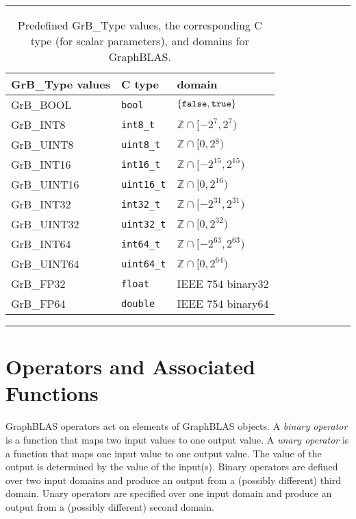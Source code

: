 \begin{table}
\hrule
\begin{center}
\caption{Predefined {\sf GrB\_Type} values, the corresponding C type (for scalar
parameters), and domains for GraphBLAS.}
\label{Tab:PredefinedTypes}
\begin{tabular}{l|l|l}
{\sf GrB\_Type values} & C type            & domain \\
\hline
{\sf GrB\_BOOL}        & {\tt bool}        & $\{ {\tt false}, {\tt true} \}$  \\
{\sf GrB\_INT8}        & {\tt int8\_t}     & $\mathbb{Z} \cap [-2^{7},2^{7})$  \\
{\sf GrB\_UINT8}       & {\tt uint8\_t}    & $\mathbb{Z} \cap [0,2{^8})$  \\
{\sf GrB\_INT16}       & {\tt int16\_t}    & $\mathbb{Z} \cap [-2^{15},2^{15})$ \\
{\sf GrB\_UINT16}      & {\tt uint16\_t}   & $\mathbb{Z} \cap [0,2^{16})$ \\
{\sf GrB\_INT32}       & {\tt int32\_t}    & $\mathbb{Z} \cap [-2^{31},2^{31})$ \\
{\sf GrB\_UINT32}      & {\tt uint32\_t}   & $\mathbb{Z} \cap [0,2^{32})$ \\
{\sf GrB\_INT64}       & {\tt int64\_t}    & $\mathbb{Z} \cap [-2^{63},2^{63})$ \\
{\sf GrB\_UINT64}      & {\tt uint64\_t}   & $\mathbb{Z} \cap [0,2^{64})$ \\
{\sf GrB\_FP32}        & {\tt float}       & IEEE 754 {\sf binary32}  \\
{\sf GrB\_FP64}        & {\tt double}      & IEEE 754 {\sf binary64}  \\
\end{tabular}
\end{center}
\hrule
\end{table}

\section{Operators and Associated Functions}

GraphBLAS operators act on elements of GraphBLAS objects.   A
 \emph{binary operator} is a function that maps two input
values to one output value. A \emph{unary operator} is a function that 
maps one input value to one output value. The value of the output is 
determined by the value of the input(s).  Binary operators are defined over 
two input domains and produce an output from a (possibly different) third 
domain. Unary operators are specified over one input domain and produce an 
output from a (possibly different) second domain.

